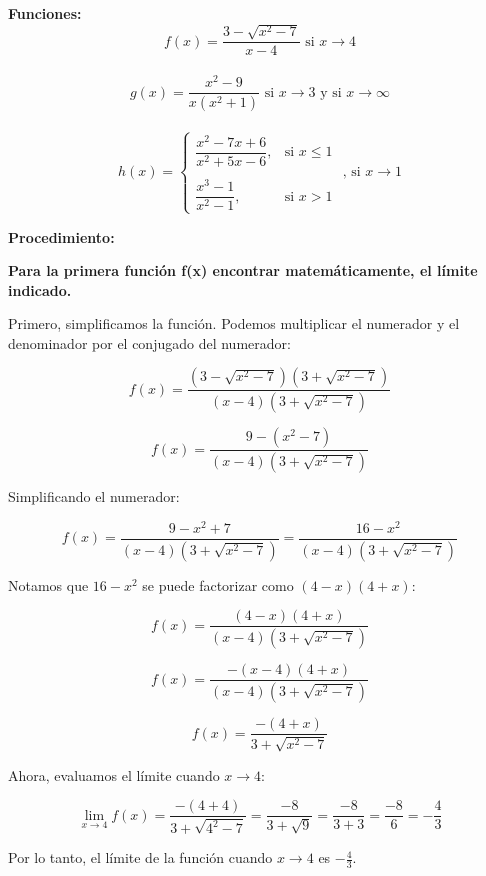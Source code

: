 \documentclass[answers]{exam} %
\begin{document}
\large\textbf{Funciones:}
\[
	f(x)=\frac{3-\sqrt{x^2-7}}{x-4} \text{ si } x \rightarrow 4
\]\\[1em]
\[
	g(x)=\frac{x^2-9}{x(x^2+1)} \text{ si } x \rightarrow 3 \text{ y si } x \rightarrow \infty
\]\\[1em]
\[
	h(x) =
	\begin{cases}
		\dfrac{x^2 - 7x + 6}{x^2 + 5x - 6}, & \text{si } x \leq 1 \\
		\\
		\dfrac{x^3 - 1}{x^2 - 1},           & \text{si } x > 1
	\end{cases}
	\text{ , si } x \rightarrow 1
\]

\vspace{1cm}
\large\textbf{Procedimiento:}\\

\begin{questions}

	\question \large\textbf{Para la primera función f(x) encontrar matemáticamente, el límite indicado.}
	\begin{solution}
		Primero, simplificamos la función. Podemos multiplicar el numerador y el denominador por el conjugado del numerador:

		\[
			f(x) = \frac{(3 - \sqrt{x^2 - 7})(3 + \sqrt{x^2 - 7})}{(x - 4)(3 + \sqrt{x^2 - 7})}
		\]

		\[
			f(x) = \frac{9 - (x^2 - 7)}{(x - 4)(3 + \sqrt{x^2 - 7})}
		\]

		Simplificando el numerador:

		\[
			f(x) = \frac{9 - x^2 + 7}{(x - 4)(3 + \sqrt{x^2 - 7})} = \frac{16 - x^2}{(x - 4)(3 + \sqrt{x^2 - 7})}
		\]

		Notamos que \( 16 - x^2 \) se puede factorizar como \( (4 - x)(4 + x) \):

		\[
			f(x) = \frac{(4 - x)(4 + x)}{(x - 4)(3 + \sqrt{x^2 - 7})}
		\]


		\[
			f(x) = \frac{-(x - 4)(4 + x)}{(x - 4)(3 + \sqrt{x^2 - 7})}
		\]


		\[
			f(x) = \frac{-(4 + x)}{3 + \sqrt{x^2 - 7}}
		\]

		Ahora, evaluamos el límite cuando \( x \rightarrow 4 \):

		\[
			\lim_{{x \to 4}} f(x) = \frac{-(4 + 4)}{3 + \sqrt{4^2 - 7}} = \frac{-8}{3 + \sqrt{9}} = \frac{-8}{3 + 3} = \frac{-8}{6} = -\frac{4}{3}
		\]

		Por lo tanto, el límite de la función cuando \( x \rightarrow 4 \) es \( -\frac{4}{3} \).


\end{solution}
\end{questions}
\end{document}
